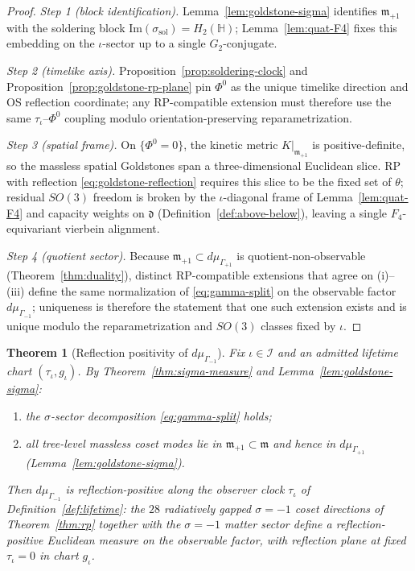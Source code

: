 \documentclass[aps,prd,onecolumn,amsmath,amssymb,nofootinbib,11pt]{revtex4-2}
\numberwithin{equation}{section}
\theoremstyle{plain}
\newtheorem{theorem}{Theorem}[section]
\theoremstyle{definition}
\theoremstyle{remark}
\newcommand{\Quat}{\mathbb{H}}
\newcommand{\orderparam}{\Phi}
\begin{document}
\begin{proof}
\emph{Step 1 (block identification).} Lemma~\ref{lem:goldstone-sigma}
identifies $\mathfrak{m}_{+1}$ with the soldering block
$\mathrm{Im}(\sigma_{\mathrm{sol}})=H_2(\Quat)$; Lemma~\ref{lem:quat-F4}
fixes this embedding on the $\iota$-sector up to a single $G_2$-conjugate.

\emph{Step 2 (timelike axis).} Proposition~\ref{prop:soldering-clock} and
Proposition~\ref{prop:goldstone-rp-plane} pin $\orderparam^0$ as the unique
timelike direction and OS reflection coordinate; any RP-compatible extension
must therefore use the same $\tau_\iota$--$\orderparam^0$ coupling modulo
orientation-preserving reparametrization.

\emph{Step 3 (spatial frame).} On $\{\orderparam^0=0\}$, the kinetic metric
$K|_{\mathfrak{m}_{+1}}$ is positive-definite, so the massless spatial
Goldstones span a three-dimensional Euclidean slice. RP with reflection
\eqref{eq:goldstone-reflection} requires this slice to be the fixed set of
$\theta$; residual $SO(3)$ freedom is broken by the $\iota$-diagonal frame
of Lemma~\ref{lem:quat-F4} and capacity weights on $\mathfrak{d}$
(Definition~\ref{def:above-below}), leaving a single $F_4$-equivariant
vierbein alignment.

\emph{Step 4 (quotient sector).} Because $\mathfrak{m}_{+1}\subset
d\mu_{\Gamma_{+1}}$ is quotient-non-observable
(Theorem~\ref{thm:duality}), distinct RP-compatible extensions that agree on
(i)--(iii) define the same normalization of \eqref{eq:gamma-split} on the
observable factor $d\mu_{\Gamma_{-1}}$; uniqueness is therefore the statement
that one such extension exists and is unique modulo the reparametrization and
$SO(3)$ classes fixed by $\iota$.
\end{proof}

\begin{theorem}[Reflection positivity of $d\mu_{\Gamma_{-1}}$]
\label{thm:rp-gamma-neg}
Fix $\iota\in\mathcal{I}$ and an admitted lifetime chart
$(\tau_\iota,g_\iota)$. By Theorem~\ref{thm:sigma-measure} and
Lemma~\ref{lem:goldstone-sigma}:
\begin{enumerate}[label=(\roman*),leftmargin=*]
  \item the $\sigma$-sector decomposition \eqref{eq:gamma-split} holds;
  \item all tree-level massless coset modes lie in
    $\mathfrak{m}_{+1}\subset\mathfrak{m}$ and hence in $d\mu_{\Gamma_{+1}}$
    (Lemma~\ref{lem:goldstone-sigma}).
\end{enumerate}
Then $d\mu_{\Gamma_{-1}}$ is reflection-positive along the observer clock
$\tau_\iota$ of Definition~\ref{def:lifetime}: the $28$ radiatively gapped
$\sigma=-1$ coset directions of Theorem~\ref{thm:rp} together with the
$\sigma=-1$ matter sector define a reflection-positive Euclidean measure on
the observable factor, with reflection plane at fixed $\tau_\iota=0$ in chart
$g_\iota$.
\end{theorem}
\end{document}
